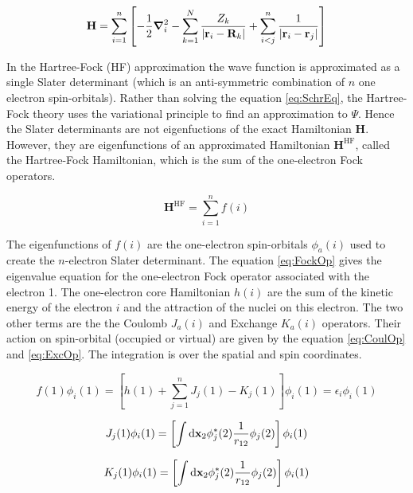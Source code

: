\documentclass[11pt,a4paper]{article}
\newcommand{\bH}{\mathbf{H}}
\begin{document}
\begin{equation}\label{eq:ExactHamiltonian}
    \bH=\sum\limits_{i=1}^{n}\left[ -\frac{1}{2}\grad_i^2 - \sum\limits_{k=1}^{N} \frac{Z_k}{|\vb{r}_i-\vb{R}_k|}+\sum\limits_{i<j}^{n}\frac{1}{|\vb{r}_i-\vb{r}_j|}\right]
\end{equation}

In the Hartree-Fock (HF) approximation the wave function is approximated as a single Slater determinant (which is an anti-symmetric combination of $n$ one electron spin-orbitals). Rather than solving the equation \eqref{eq:SchrEq}, the Hartree-Fock theory uses the variational principle to find an approximation to $\Psi$. Hence the Slater determinants are not eigenfuctions of the exact Hamiltonian $\bH$. However, they are eigenfunctions of an approximated Hamiltonian $\bH^{\text{HF}}$, called the Hartree-Fock Hamiltonian, which is the sum of the one-electron Fock operators.

\begin{equation}\label{eq:HFHamiltonian}
\bH^{\text{HF}}= \sum\limits_{i=1}^{n} f(i)
\end{equation}

The eigenfunctions of $f(i)$ are the one-electron spin-orbitals $\phi_a(i)$ used to create the $n$-electron Slater determinant. The equation \eqref{eq:FockOp} gives the eigenvalue equation for the one-electron Fock operator associated with the electron 1. The one-electron core Hamiltonian $h(i)$ are the sum of the kinetic energy of the electron $i$ and the attraction of the nuclei on this electron. The two other terms are the the Coulomb $J_a(i)$ and Exchange $K_a(i)$ operators. Their action on spin-orbital (occupied or virtual) are given by the equation \eqref{eq:CoulOp} and \eqref{eq:ExcOp}. The integration is over the spatial and spin coordinates.

\begin{equation}\label{eq:FockOp}
f(1)\phi_i(1) = \left[h(1) + \sum\limits_{j=1}^{n} J_j(1) - K_j(1)\right]\phi_i(1)=\epsilon_i\phi_i(1)
\end{equation}

\begin{equation}\label{eq:CoulOp}
J_j(1)\phi_i(1)=\left[\int\dd\vb{x}_2\phi_j^*(2)\frac{1}{r_{12}}\phi_j(2) \right]\phi_i(1)
\end{equation}

\begin{equation}\label{eq:ExcOp}
K_j(1)\phi_i(1)=\left[\int\dd\vb{x}_2\phi_j^*(2)\frac{1}{r_{12}}\phi_j(2) \right]\phi_i(1)
\end{equation}
\end{document}
